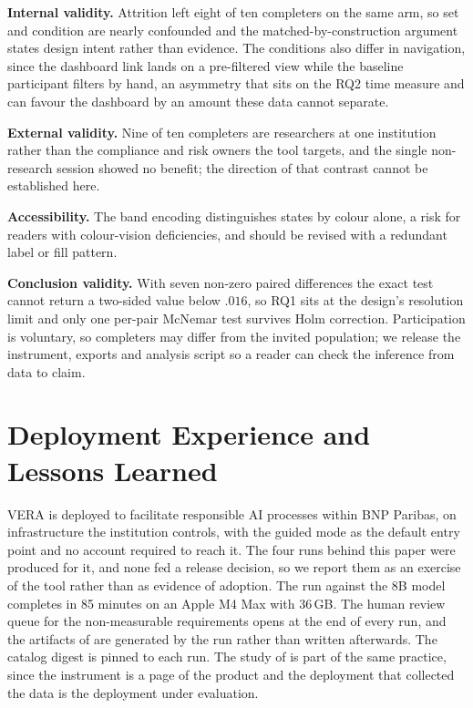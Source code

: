 \documentclass[10pt,conference,a4paper]{IEEEtran}
\begin{document}
\textbf{Internal validity.}
Attrition left eight of ten completers on the same arm, so set and condition are nearly confounded and the matched-by-construction argument states design intent rather than evidence. The conditions also differ in navigation, since the dashboard link lands on a pre-filtered view while the baseline participant filters by hand, an asymmetry that sits on the RQ2 time measure and can favour the dashboard by an amount these data cannot separate.

\textbf{External validity.}
Nine of ten completers are researchers at one institution rather than the compliance and risk owners the tool targets, and the single non-research session showed no benefit; the direction of that contrast cannot be established here.

\textbf{Accessibility.}
The band encoding distinguishes states by colour alone, a risk for readers with colour-vision deficiencies, and should be revised with a redundant label or fill pattern.

\textbf{Conclusion validity.}
With seven non-zero paired differences the exact test cannot return a two-sided value below $.016$, so RQ1 sits at the design's resolution limit and only one per-pair McNemar test survives Holm correction. Participation is voluntary, so completers may differ from the invited population; we release the instrument, exports and analysis script so a reader can check the inference from data to claim.

\section{Deployment Experience and Lessons Learned}
\label{sec:lessons}

VERA is deployed to facilitate responsible AI processes within BNP Paribas, on infrastructure the institution controls, with the guided mode as the default entry point and no account required to reach it.
The four runs behind this paper were produced for it, and none fed a release decision, so we report them as an exercise of the tool rather than as evidence of adoption.
The run against the 8B model completes in 85 minutes on an Apple M4 Max with 36\,GB.
The human review queue for the non-measurable requirements opens at the end of every run, and the artifacts of  are generated by the run rather than written afterwards.
The catalog digest is pinned to each run.
The study of  is part of the same practice, since the instrument is a page of the product and the deployment that collected the data is the deployment under evaluation.
\end{document}
